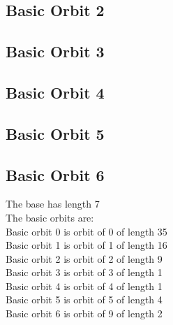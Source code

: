 

\bigskip

\subsection*{Basic Orbit 2}



\bigskip

\subsection*{Basic Orbit 3}



\bigskip

\subsection*{Basic Orbit 4}



\bigskip

\subsection*{Basic Orbit 5}



\bigskip

\subsection*{Basic Orbit 6}



\bigskip
The base has length 7\\
The basic orbits are: \\
Basic orbit 0 is orbit of 0 of length 35\\
Basic orbit 1 is orbit of 1 of length 16\\
Basic orbit 2 is orbit of 2 of length 9\\
Basic orbit 3 is orbit of 3 of length 1\\
Basic orbit 4 is orbit of 4 of length 1\\
Basic orbit 5 is orbit of 5 of length 4\\
Basic orbit 6 is orbit of 9 of length 2\\

